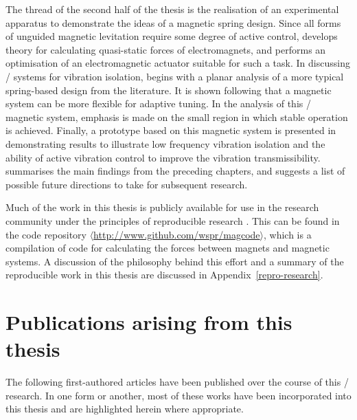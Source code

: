 \documentclass[11pt,a4paper]{memoir}
\begin{document}
The thread of the second half of the thesis is the realisation of an experimental apparatus to demonstrate the ideas of a magnetic spring design.
Since all forms of unguided magnetic levitation require some degree of active control,  develops theory for calculating quasi-static forces of electromagnets, and performs an optimisation of an electromagnetic actuator suitable for such a task.
In discussing \qzs/ systems for vibration isolation,  begins with a planar analysis of a more typical spring-based design from the literature.
It is shown following that a magnetic system can be more flexible for adaptive tuning.
In the analysis of this \qzs/ magnetic system, emphasis is made on the small region in which stable operation is achieved.
Finally, a prototype based on this magnetic system is presented in  demonstrating results to illustrate low frequency vibration isolation and the ability of active vibration control to improve the vibration transmissibility.
 summarises the main findings from the preceding chapters, and suggests a list of possible future directions to take for subsequent research.

Much of the work in this thesis is publicly available for use in the research community under the principles of reproducible research \parencite{kovacevic2007-icassp}.
This can be found in the code repository $\langle$\url{http://www.github.com/wspr/magcode}$\rangle$, which is a compilation of code for calculating the forces between magnets and magnetic systems.
A discussion of the philosophy behind this effort and a summary of the reproducible work in this thesis are discussed in Appendix~\ref{repro-research}.

\section{Publications arising from this thesis}

The following first-authored articles have been published over the course of this \PhD/{} research.
In one form or another, most of these works have been incorporated into this thesis and are highlighted herein where appropriate.

\def\citejournal#1{
\item[\cite{#1}]
\emph{\citetitle{#1}};
\citefield{#1}{journaltitle}, \citeyear{#1}.
\medskip
}

\def\citeconf#1{
\item[\cite{#1}]
\emph{\citetitle{#1}};
\citefield{#1}{booktitle}, \citeyear{#1}.
\medskip
}
\end{document}
